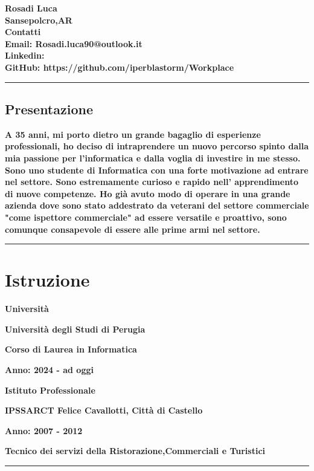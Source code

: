 \documentclass{article}
\newenvironment{listaIdentazione}[1]{
			\begin{list}{}{
			  \setlength{\leftmargin}{#1} %
			  \setlength{\itemsep}{0pt}	%
			  \setlength{\parskip}{0pt} %
			  \setlength{\parsep}{0pt} %
			  \setlength{\labelwidth}{0pt} %
			  \setlength{\labelsep}{0pt} %
			  \renewcommand{\makelabel}[1]{} %
			  }
			}{\end{list}}
\newcommand{\spaziocorto}{\\[0.1cm]}
\newcommand{\spaziolungo}{\\[0.3cm]}
\begin{document}
\vspace{-0.2cm}
\begin{flushleft}
	\textbf{\Huge{Rosadi Luca}}
	\spaziocorto
	\textbf{\Large{Sansepolcro,\Large{AR}}}
	\spaziolungo
	\textbf{\Large{Contatti}}
		\spaziocorto
		\textbf{\Large{Email: Rosadi.luca90@outlook.it}}
		\spaziocorto
		\textbf{\Large{Linkedin: }}
		\spaziocorto
		\textbf{\Large{GitHub: https://github.com/iperblastorm/Workplace}}
		\spaziocorto
\end{flushleft}

\hrule

\begin{center}
\section*{\LARGE{Presentazione}}
\end{center}
\begin{flushleft}
	\textbf{\Large{A 35 anni, mi porto dietro un grande bagaglio di esperienze
	professionali, ho deciso di intraprendere un nuovo percorso spinto dalla mia
	passione per l'informatica e dalla voglia di investire in me stesso. Sono uno
	studente di Informatica con una forte motivazione ad entrare nel settore. Sono
	estremamente curioso e rapido nell' apprendimento di nuove competenze. Ho già
	avuto modo di operare in una grande azienda dove sono stato addestrato da
	veterani del settore commerciale "come ispettore commerciale" ad essere
	versatile e proattivo, sono comunque consapevole di essere alle prime armi nel
	settore.}}
\end{flushleft}

\hrule

\section*{\LARGE{Istruzione}}
\begin{flushleft}
		\textbf{\Large{Università}}
		\spaziocorto
			\begin{listaIdentazione}{0.5cm}
			\item{\textbf{\Large{Università degli Studi di Perugia}}}
			\spaziocorto
			\item {\textbf{\Large{Corso di Laurea in Informatica}}}
			\item {\textbf{\Large{Anno: 2024 - ad oggi}}}
			\spaziolungo
			\end{listaIdentazione}
		\textbf{\Large{Istituto Professionale}}
		\spaziocorto
			\begin{listaIdentazione}{0.5cm}
			\item{\textbf{\Large{IPSSARCT Felice Cavallotti, Città di Castello}}}
			\spaziocorto
			\item \textbf{\Large{Anno: 2007 - 2012}}
			\spaziocorto
			\item \textbf{\Large{Tecnico dei servizi della Ristorazione,Commerciali e
			Turistici}}
			\spaziocorto
			\end{listaIdentazione}
\end{flushleft}
\hrule
\end{document}
